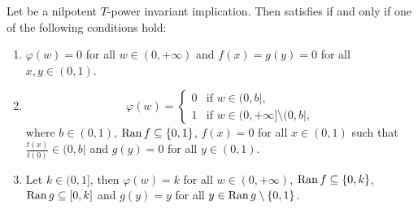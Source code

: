 \begin{proposition}\label{prop:nilpotent:(IB)}
Let \IT be a nilpotent $T$-power invariant implication. Then \IT satisfies \IB if and only if one of the following conditions hold:
\begin{enumerate}[label=(\roman*)]
	\item $\varphi(w)=0$ for all $w \in (0,+\infty)$ and $f(x)=g(y)=0$ for all $x,y \in (0,1)$.
	\item 						$$
	\varphi(w)
	=
	\left\{ \begin{array}{ll}
		0 &   \text{if }   w \in (0,b|, \\
		1 & \text{if } w \in (0,+\infty] \setminus (0,b|,
	\end{array}
	\right.
	$$
	where $b \in (0,1)$, $ \operatorname{Ran} f \subseteq \{0,1\}$, $f(x)=0$ for all $x \in (0,1)$ such that $\frac{t(x)}{t(0)} \in (0,b|$ and $g(y)=0$ for all $y \in (0,1)$.
	\item Let $k \in (0,1]$, then $\varphi(w)=k$ for all $w \in (0,+\infty)$, $\operatorname{Ran} f  \subseteq \{0,k\}$, $\operatorname{Ran} g \subseteq [0,k]$ and $g(y)=y$ for all $y \in \operatorname{Ran} g \setminus \{0,1\}$.
\end{enumerate}
\end{proposition}


